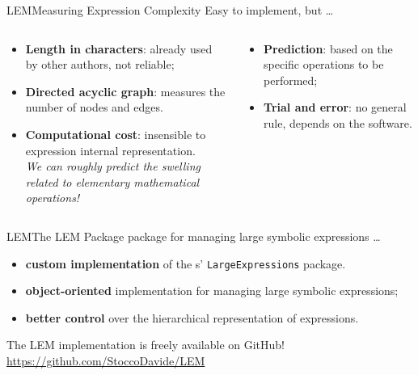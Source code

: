 \begin{frame}{\acl{LEM}}{Measuring Expression Complexity}
  Easy to implement, but \dots
  \vspace{1.5em}
  \begin{columns}
    \begin{column}[t]{0.5\textwidth}
      \begin{itemize}
        \normalsize
        \item \textbf{Length in characters}: already used by other authors, not reliable;
        \item \textbf{Directed acyclic graph}: measures the number of nodes and edges.
        \item \textbf{Computational cost}: insensible to expression internal representation. \\[0.25em]
        \emph{We can roughly predict the swelling related to elementary mathematical operations!}
      \end{itemize}
    \end{column}
    \begin{column}[t]{0.5\textwidth}
      \begin{itemize}
        \normalsize
        \item \textbf{Prediction}: based on the specific operations to be performed;
        \item \textbf{Trial and error}: no general rule, depends on the software.
      \end{itemize}
    \end{column}
  \end{columns}
\end{frame}

\begin{frame}{\acl{LEM}}{The \ac{LEM} Package}
  \Maple{} package for managing large symbolic expressions \dots
  \begin{itemize}
    \item \textbf{custom implementation} of the \Maple{}s' \texttt{LargeExpressions} package.
    \item \textbf{object-oriented} implementation for managing large symbolic expressions;
    \item \textbf{better control} over the hierarchical representation of expressions.
  \end{itemize}
  \begin{bbox}
    The LEM implementation is freely available on GitHub! \\
    \centering \url{https://github.com/StoccoDavide/LEM}
  \end{bbox}
\end{frame}


